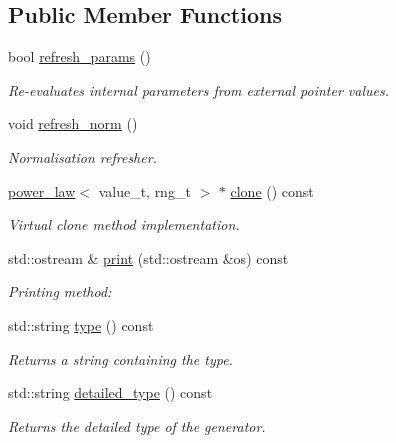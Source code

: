 \subsection*{Public Member Functions}
\begin{DoxyCompactItemize}
\item 
bool \hyperlink{a00434_af910f1d7b90205f53714bc6da16407b8}{refresh\+\_\+params} ()
\begin{DoxyCompactList}\small\item\em Re-\/evaluates internal parameters from external pointer values. \end{DoxyCompactList}\item 
\hypertarget{a00434_a57ee39f8f16a6a8b757727ad411bd480}{}void \hyperlink{a00434_a57ee39f8f16a6a8b757727ad411bd480}{refresh\+\_\+norm} ()\label{a00434_a57ee39f8f16a6a8b757727ad411bd480}

\begin{DoxyCompactList}\small\item\em Normalisation refresher. \end{DoxyCompactList}\item 
\hypertarget{a00434_a1491d799cdc4af17521a73520f731770}{}\hyperlink{a00434}{power\+\_\+law}$<$ value\+\_\+t, rng\+\_\+t $>$ $\ast$ \hyperlink{a00434_a1491d799cdc4af17521a73520f731770}{clone} () const \label{a00434_a1491d799cdc4af17521a73520f731770}

\begin{DoxyCompactList}\small\item\em Virtual clone method implementation. \end{DoxyCompactList}\item 
\hypertarget{a00434_a69068abc23264df133a9f0a60cc1f795}{}std\+::ostream \& \hyperlink{a00434_a69068abc23264df133a9f0a60cc1f795}{print} (std\+::ostream \&os) const \label{a00434_a69068abc23264df133a9f0a60cc1f795}

\begin{DoxyCompactList}\small\item\em Printing method\+: \end{DoxyCompactList}\item 
\hypertarget{a00434_ad743a56b338628dfc525c4d015506054}{}std\+::string \hyperlink{a00434_ad743a56b338628dfc525c4d015506054}{type} () const \label{a00434_ad743a56b338628dfc525c4d015506054}

\begin{DoxyCompactList}\small\item\em Returns a string containing the type. \end{DoxyCompactList}\item 
\hypertarget{a00434_ac26689583670e518a41959525ee0b363}{}std\+::string \hyperlink{a00434_ac26689583670e518a41959525ee0b363}{detailed\+\_\+type} () const \label{a00434_ac26689583670e518a41959525ee0b363}

\begin{DoxyCompactList}\small\item\em Returns the detailed type of the generator. \end{DoxyCompactList}\end{DoxyCompactItemize}
